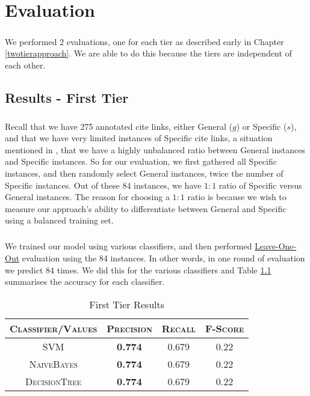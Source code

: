 \chapter{Evaluation}
\label{evaluation}
\paragraph{}
We performed 2 evaluations, one for each tier as described early in Chapter \ref{twotierapproach}. We are able to do this because the tiers are independent of each other.

\section{Results - First Tier}
\paragraph{}
Recall that we have 275 annotated cite links, either General ($g$) or Specific ($s$), and that we have very limited instances of Specific cite links, a situation mentioned in \cite{li2010negative}, that we have a highly unbalanced ratio between General instances and Specific instances. So for our evaluation, we first gathered all Specific instances, and then randomly select General instances, twice the number of Specific instances. Out of these 84 instances, we have $1:1$ ratio of Specific versus General instances. The reason for choosing a $1:1$ ratio is because we wish to measure our approach's ability to differentiate between General and Specific using a balanced training set.

\paragraph{}
We trained our model using various classifiers, and then performed \url{Leave-One-Out} evaluation using the 84 instances. In other words, in one round of evaluation we predict 84 times. We did this for the various classifiers and Table \ref{tab:firsttieresults} summarises the accuracy for each classifier.

\begin{table}[h]
	\center
	\begin{tabular}{ c | c  c  c }
		\textsc{Classifier/Values} & \textsc{Precision} & \textsc{Recall} & \textsc{F-Score} \\
		\hline
		\textsc{SVM} 			& \textbf{0.774} & 0.679 & 0.22 \\
		\textsc{NaiveBayes} 	& \textbf{0.774} & 0.679 & 0.22 \\
		\textsc{DecisionTree}	& \textbf{0.774} & 0.679 & 0.22
	\end{tabular}
	\caption{First Tier Results}
	\label{tab:firsttieresults}
\end{table}

